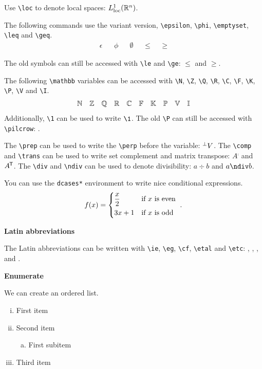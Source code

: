 \documentclass[parskip]{myarticle}
\begin{document}
Use \verb|\loc| to denote local spaces: $L_{\mathrm{loc}}^1(\mathbb{R}^n)$.

The following commands use the variant version, \verb|\epsilon|, \verb|\phi|, \verb|\emptyset|, \verb|\leq| and \verb|\geq|.
\begin{align*}
    \epsilon && \phi && \emptyset && \leq && \geq
\end{align*}

The old symbols can still be accessed with \verb|\le| and \verb|\ge|: $\le$ and $\ge$.

The following \verb|\mathbb| variables can be accessed with \verb|\N|, \verb|\Z|, \verb|\Q|, \verb|\R|, \verb|\C|, \verb|\F|, \verb|\K|, \verb|\P|, \verb|\V| and \verb|\I|.
\begin{align*}
    \mathbb{N} && \mathbb{Z} && \mathbb{Q} && \mathbb{R} && \mathbb{C} && \mathbb{F} && \mathbb{K} && \mathbb{P} && \mathbb{V} && \mathbb{I}
\end{align*}
Additionally, \verb|\1| can be used to write $\1$. The old \verb|\P| can still be accessed with \verb|\pilcrow|: \pilcrow.

The \verb|\prep| can be used to write the \verb|\perp| before the variable: ${}^\perp V$. The \verb|\comp| and \verb|\trans| can be used to write set complement and matrix transpose: $A^\comp$ and $A^{\mkern-1.5mu\mathsf{T}}$. The \verb|\div| and \verb|\ndiv| can be used to denote divisibility: $a \div b$ and $a \ndiv b$.

You can use the \verb|dcases*| environment to write nice conditional expressions.
\begin{align*}
    f(x) = \begin{dcases*}
        \frac{x}{2} & if $x$ is even \\
        3x + 1 & if $x$ is odd
    \end{dcases*}.
\end{align*}

\textbf{Latin abbreviations}

The Latin abbreviations can be written with \verb|\ie|, \verb|\eg|, \verb|\cf|, \verb|\etal| and \verb|\etc|: \ie, \eg, \cf, \etal and \etc.

\newpage

\textbf{Enumerate}

We can create an ordered list.

\begin{enumerate}[i.]
    \item First item
    \item Second item
    \begin{enumerate}[(a)]
        \item First subitem
    \end{enumerate}
    \item Third item
\end{enumerate}
\end{document}
